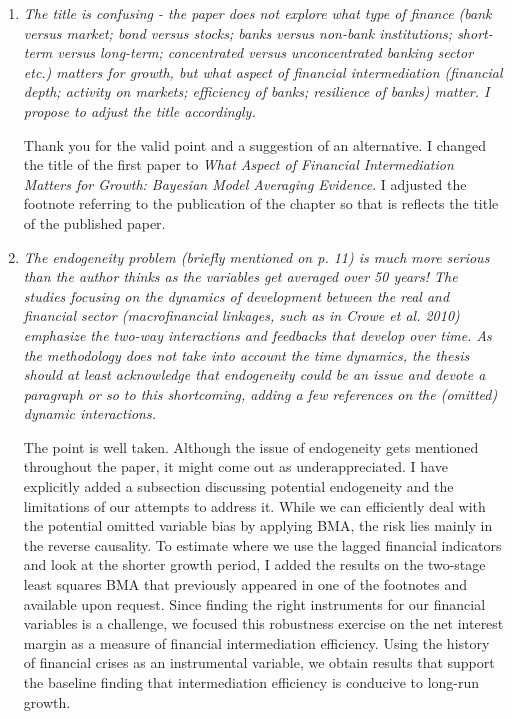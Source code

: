 \begin{enumerate}
       
    \item \textit{The title is confusing - the paper does not explore what type of finance (bank versus market; bond versus stocks; banks versus non-bank institutions; short-term versus long-term; concentrated versus unconcentrated banking sector etc.) matters for growth, but what aspect of financial intermediation (financial depth; activity on markets; efficiency of banks; resilience of banks) matter. I propose to adjust the title accordingly.}
    
    Thank you for the valid point and a suggestion of an alternative. I changed the title of the first paper to \emph{What Aspect of Financial Intermediation Matters for Growth: Bayesian Model Averaging Evidence}. I adjusted the footnote referring to the publication of the chapter so that is reflects the title of the published paper.

    \item \textit{The endogeneity problem (briefly mentioned on p. 11) is much more serious than the author thinks as the variables get averaged over 50 years! The studies focusing on the dynamics of development between the real and financial sector (macrofinancial linkages, such as in Crowe et al. 2010) emphasize the two-way interactions and feedbacks that develop over time. As the methodology does not take into account the time dynamics, the thesis should at least acknowledge that endogeneity could be an issue and devote a paragraph or so to this shortcoming, adding a few references on the (omitted) dynamic interactions.}
    
    The point is well taken. Although the issue of endogeneity gets mentioned throughout the paper, it might come out as underappreciated. I have explicitly added a subsection discussing potential endogeneity and the limitations of our attempts to address it. While we can efficiently deal with the potential omitted variable bias by applying \ac{BMA}, the risk lies mainly in the reverse causality. To estimate where we use the lagged financial indicators and look at the shorter growth period, I added the results on the two-stage least squares \ac{BMA} that previously appeared in one of the footnotes and available upon request. Since finding the right instruments for our financial variables is a challenge, we focused this robustness exercise on the net interest margin as a measure of financial intermediation efficiency. Using the history of financial crises as an instrumental variable, we obtain results that support the baseline finding that intermediation efficiency is conducive to long-run growth.
    

\end{enumerate}
